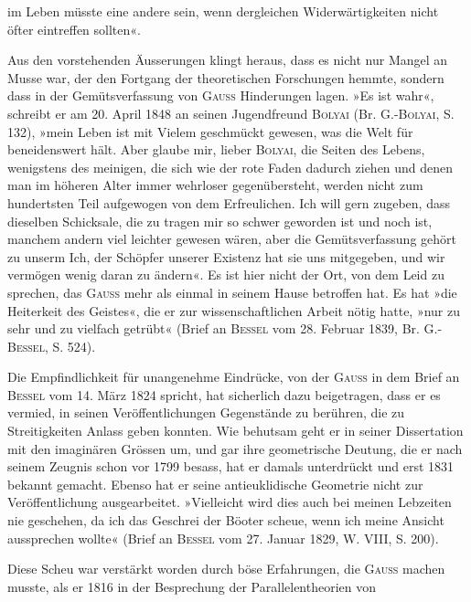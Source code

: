 \clearpage\begingroup{}
\renewcommand{\thefootnote}{\arabic{footnote})}
\noindent im Leben müsste eine andere sein, wenn dergleichen Widerwärtigkeiten nicht
öfter eintreffen sollten«.
\par
Aus den vorstehenden Äusserungen klingt heraus, dass es nicht nur Mangel
an Musse war, der den Fortgang der theoretischen Forschungen hemmte, sondern
dass in der Gemütsverfassung von \textsc{Gauss} Hinderungen lagen. »Es ist
wahr«, schreibt er am 20. April 1848 an seinen Jugendfreund \textsc{Bolyai} (Br. G.-\textsc{Bolyai},
S. 132), »mein Leben ist mit Vielem geschmückt gewesen, was die
Welt für beneidenswert hält. Aber glaube mir, lieber \textsc{Bolyai}, die 
Seiten des Lebens, wenigstens des meinigen, die sich wie der rote Faden dadurch
ziehen und denen man im höheren Alter immer wehrloser gegenübersteht,
werden nicht zum hundertsten Teil aufgewogen von dem Erfreulichen.
Ich will gern zugeben, dass dieselben Schicksale, die zu tragen mir so schwer
geworden ist und noch ist, manchem andern viel leichter gewesen wären, aber
die Gemütsverfassung gehört zu unserm Ich, der Schöpfer unserer Existenz
hat sie uns mitgegeben, und wir vermögen wenig daran zu ändern«. Es ist
hier nicht der Ort, von dem Leid zu sprechen, das \textsc{Gauss} mehr als einmal
in seinem Hause betroffen hat. Es hat »die Heiterkeit des Geistes«, die er
zur wissenschaftlichen Arbeit nötig hatte, »nur zu sehr und zu vielfach getrübt«
(Brief an \textsc{Bessel} vom 28. Februar 1839, Br. G.-\textsc{Bessel}, S. 524).
\par
Die Empfindlichkeit für unangenehme Eindrücke, von der \textsc{Gauss} in dem
Brief an \textsc{Bessel} vom 14. März 1824 spricht, hat sicherlich dazu beigetragen,
dass er es vermied, in seinen Veröffentlichungen Gegenstände zu berühren,
die zu Streitigkeiten Anlass geben konnten. Wie behutsam geht er in seiner
Dissertation mit den imaginären Grössen um, und gar ihre geometrische Deutung,
die er nach seinem Zeugnis schon vor 1799 besass, hat er damals unterdrückt
und erst 1831 bekannt gemacht. Ebenso hat er seine antieuklidische
Geometrie nicht zur Veröffentlichung ausgearbeitet. »Vielleicht wird dies auch
bei meinen Lebzeiten nie geschehen, da ich das Geschrei der Böoter scheue,
wenn ich meine Ansicht  aussprechen wollte« (Brief an \textsc{Bessel} vom
27. Januar 1829, W. VIII, S. 200).
\par
Diese Scheu war verstärkt worden durch böse Erfahrungen, die \textsc{Gauss}
machen musste, als er 1816 in der Besprechung der Parallelentheorien von
